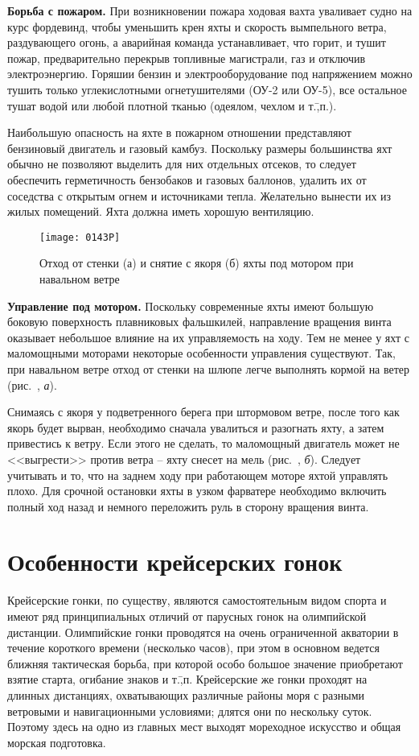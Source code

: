 \textbf{Борьба с пожаром.} При возникновении пожара ходовая вахта уваливает судно на курс фордевинд, чтобы уменьшить крен яхты и скорость вымпельного ветра, раздувающего огонь, а аварийная команда устанавливает, что горит, и тушит пожар, предварительно перекрыв топливные магистрали, газ и отключив электроэнергию. Горяшии бензин и электрооборудование под напряжением можно тушить только углекислотными огнетушителями (ОУ-2 или ОУ-5), все остальное тушат водой или любой плотной тканью (одеялом, чехлом и т.\=,п.).

Наибольшую опасность на яхте в пожарном отношении представляют бензиновый двигатель и газовый камбуз. Поскольку размеры большинства яхт обычно не позволяют выделить для них отдельных отсеков, то следует обеспечить герметичность бензобаков и газовых баллонов, удалить их от соседства с открытым огнем и источниками тепла. Желательно вынести их из жилых помещений. Яхта должна иметь хорошую вентиляцию. 

\begin{figure*}[htb]
  \centering{}
  \texttt{[image: 0143P]}
  \caption{Отход от стенки (а) и снятие с якоря (б) яхты под мотором при навальном ветре}
  \label{fig:143}
\end{figure*}

\textbf{Управление под мотором.} Поскольку современные яхты имеют большую боковую поверхность плавниковых фальшкилей, направление вращения винта оказывает небольшое влияние на их управляемость на ходу. Тем не менее у яхт с маломощными моторами некоторые особенности управления существуют. Так, при навальном ветре отход от стенки на шлюпе  легче выполнять кормой на ветер (рис.~, \textit{а}).

Снимаясь с якоря у подветренного берега при штормовом ветре, после того как якорь будет вырван, необходимо сначала увалиться и разогнать яхту, а затем привестись к ветру. Если этого не сделать, то маломощный двигатель может не <<выгрести>> против ветра \--- яхту снесет на мель (рис.~, \textit{б}). Следует учитывать и то, что на заднем ходу при работающем моторе яхтой управлять плохо.
Для срочной остановки яхты в узком фарватере необходимо включить полный ход назад и немного переложить руль в сторону вращения винта. 

\section{Особенности крейсерских гонок}

Крейсерские гонки, по существу, являются самостоятельным видом спорта и имеют ряд принципиальных отличий от парусных гонок на олимпийской дистанции. Олимпийские гонки проводятся на очень ограниченной акватории в течение короткого времени (несколько часов), при этом в основном ведется ближняя тактическая борьба, при которой особо большое значение приобретают взятие старта, огибание знаков и т.\=,п. Крейсерские же гонки проходят на длинных дистанциях, охватывающих различные районы моря с разными ветровыми и навигационными условиями; длятся они по нескольку суток. Поэтому здесь на одно из главных мест выходят мореходное искусство и общая морская подготовка.

